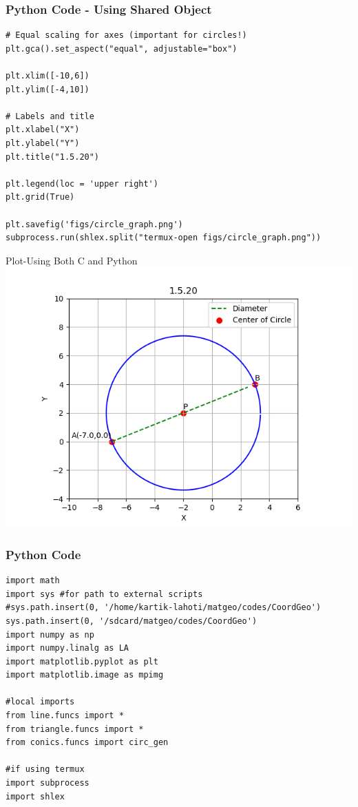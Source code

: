 \documentclass{beamer}
\begin{document}
\begin{frame}[fragile]
    \frametitle{Python Code - Using Shared Object}
    \begin{lstlisting}
# Equal scaling for axes (important for circles!)
plt.gca().set_aspect("equal", adjustable="box")

plt.xlim([-10,6])
plt.ylim([-4,10])

# Labels and title
plt.xlabel("X")
plt.ylabel("Y")
plt.title("1.5.20")

plt.legend(loc = 'upper right')
plt.grid(True)

plt.savefig('figs/circle_graph.png')
subprocess.run(shlex.split("termux-open figs/circle_graph.png"))

    \end{lstlisting}
\end{frame}

\begin{frame}{Plot-Using Both C and Python}
    \centering
    \includegraphics[width=\columnwidth, height=0.8\textheight, keepaspectratio]{figs/circle_graph.png}     
\end{frame}

\begin{frame}[fragile]
    \frametitle{Python Code}
    \begin{lstlisting}
import math
import sys #for path to external scripts
#sys.path.insert(0, '/home/kartik-lahoti/matgeo/codes/CoordGeo') 
sys.path.insert(0, '/sdcard/matgeo/codes/CoordGeo') 
import numpy as np
import numpy.linalg as LA
import matplotlib.pyplot as plt
import matplotlib.image as mpimg

#local imports
from line.funcs import *
from triangle.funcs import *
from conics.funcs import circ_gen

#if using termux
import subprocess
import shlex
\end{lstlisting}
\end{frame}
\end{document}
